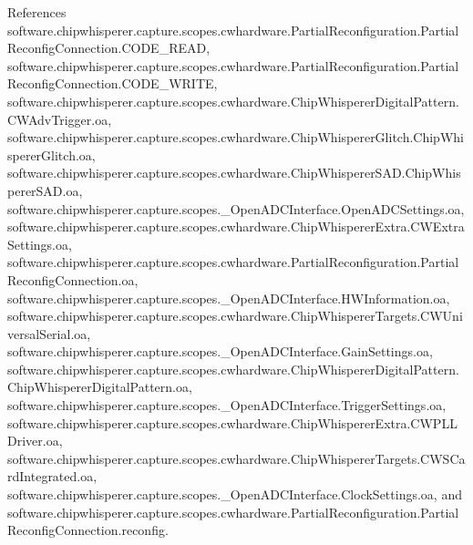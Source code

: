 References software.\+chipwhisperer.\+capture.\+scopes.\+cwhardware.\+Partial\+Reconfiguration.\+Partial\+Reconfig\+Connection.\+C\+O\+D\+E\+\_\+\+R\+E\+A\+D, software.\+chipwhisperer.\+capture.\+scopes.\+cwhardware.\+Partial\+Reconfiguration.\+Partial\+Reconfig\+Connection.\+C\+O\+D\+E\+\_\+\+W\+R\+I\+T\+E, software.\+chipwhisperer.\+capture.\+scopes.\+cwhardware.\+Chip\+Whisperer\+Digital\+Pattern.\+C\+W\+Adv\+Trigger.\+oa, software.\+chipwhisperer.\+capture.\+scopes.\+cwhardware.\+Chip\+Whisperer\+Glitch.\+Chip\+Whisperer\+Glitch.\+oa, software.\+chipwhisperer.\+capture.\+scopes.\+cwhardware.\+Chip\+Whisperer\+S\+A\+D.\+Chip\+Whisperer\+S\+A\+D.\+oa, software.\+chipwhisperer.\+capture.\+scopes.\+\_\+\+Open\+A\+D\+C\+Interface.\+Open\+A\+D\+C\+Settings.\+oa, software.\+chipwhisperer.\+capture.\+scopes.\+cwhardware.\+Chip\+Whisperer\+Extra.\+C\+W\+Extra\+Settings.\+oa, software.\+chipwhisperer.\+capture.\+scopes.\+cwhardware.\+Partial\+Reconfiguration.\+Partial\+Reconfig\+Connection.\+oa, software.\+chipwhisperer.\+capture.\+scopes.\+\_\+\+Open\+A\+D\+C\+Interface.\+H\+W\+Information.\+oa, software.\+chipwhisperer.\+capture.\+scopes.\+cwhardware.\+Chip\+Whisperer\+Targets.\+C\+W\+Universal\+Serial.\+oa, software.\+chipwhisperer.\+capture.\+scopes.\+\_\+\+Open\+A\+D\+C\+Interface.\+Gain\+Settings.\+oa, software.\+chipwhisperer.\+capture.\+scopes.\+cwhardware.\+Chip\+Whisperer\+Digital\+Pattern.\+Chip\+Whisperer\+Digital\+Pattern.\+oa, software.\+chipwhisperer.\+capture.\+scopes.\+\_\+\+Open\+A\+D\+C\+Interface.\+Trigger\+Settings.\+oa, software.\+chipwhisperer.\+capture.\+scopes.\+cwhardware.\+Chip\+Whisperer\+Extra.\+C\+W\+P\+L\+L\+Driver.\+oa, software.\+chipwhisperer.\+capture.\+scopes.\+cwhardware.\+Chip\+Whisperer\+Targets.\+C\+W\+S\+Card\+Integrated.\+oa, software.\+chipwhisperer.\+capture.\+scopes.\+\_\+\+Open\+A\+D\+C\+Interface.\+Clock\+Settings.\+oa, and software.\+chipwhisperer.\+capture.\+scopes.\+cwhardware.\+Partial\+Reconfiguration.\+Partial\+Reconfig\+Connection.\+reconfig.



